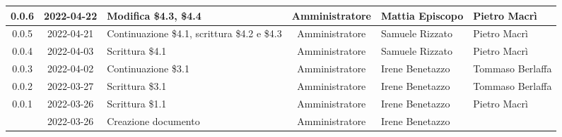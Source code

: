 \begin{center}
\begin{longtable}{ |c|c|p{8em}|c|m{5em}|m{6em}| }
	\hline
	0.0.6 & 2022-04-22 & Modifica \newline \$4.3, \$4.4 & Amministratore & Mattia \newline Episcopo & Pietro \newline Macrì\\
	\hline
	0.0.5 & 2022-04-21 & Continuazione \$4.1, scrittura \$4.2 e \$4.3 & Amministratore & Samuele \newline Rizzato & Pietro \newline Macrì\\
	\hline
	0.0.4 & 2022-04-03 & Scrittura \$4.1 & Amministratore & Samuele \newline Rizzato & Pietro \newline Macrì\\
	\hline
	0.0.3 & 2022-04-02 & Continuazione \$3.1 & Amministratore & Irene \newline Benetazzo & Tommaso \newline Berlaffa \\
	\hline
	0.0.2 & 2022-03-27 & Scrittura \$3.1 & Amministratore & Irene \newline Benetazzo & Tommaso \newline Berlaffa \\
	\hline
	0.0.1 & 2022-03-26 & Scrittura \$1.1 & Amministratore & Irene \newline Benetazzo & Pietro \newline Macrì \\
	\hline
    & 2022-03-26 & Creazione documento & Amministratore & Irene \newline Benetazzo & \\
	\hline
	\end{longtable}
	\end{center}
	\newpage
